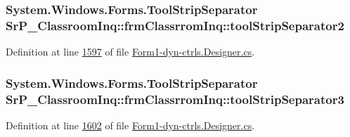 \hypertarget{class_sr_p___classroom_inq_1_1frm_classrrom_inq_aa51d7952b4dde9caa9d7e111353a2047}{
\subsubsection[{tool\-Strip\-Separator2}]{\setlength{\rightskip}{0pt plus 5cm}\-System.\-Windows.\-Forms.\-Tool\-Strip\-Separator {\bf \-Sr\-P\-\_\-\-Classroom\-Inq\-::frm\-Classrrom\-Inq\-::tool\-Strip\-Separator2}}}
\label{class_sr_p___classroom_inq_1_1frm_classrrom_inq_aa51d7952b4dde9caa9d7e111353a2047}


\-Definition at line \hyperlink{_form1-dyn-ctrls_8_designer_8cs_source_l01597}{1597} of file \hyperlink{_form1-dyn-ctrls_8_designer_8cs_source}{\-Form1-\/dyn-\/ctrls.\-Designer.\-cs}.

\hypertarget{class_sr_p___classroom_inq_1_1frm_classrrom_inq_ac7f725652d980e8ef92f1119843f02a0}{
\subsubsection[{tool\-Strip\-Separator3}]{\setlength{\rightskip}{0pt plus 5cm}\-System.\-Windows.\-Forms.\-Tool\-Strip\-Separator {\bf \-Sr\-P\-\_\-\-Classroom\-Inq\-::frm\-Classrrom\-Inq\-::tool\-Strip\-Separator3}}}
\label{class_sr_p___classroom_inq_1_1frm_classrrom_inq_ac7f725652d980e8ef92f1119843f02a0}


\-Definition at line \hyperlink{_form1-dyn-ctrls_8_designer_8cs_source_l01602}{1602} of file \hyperlink{_form1-dyn-ctrls_8_designer_8cs_source}{\-Form1-\/dyn-\/ctrls.\-Designer.\-cs}.

